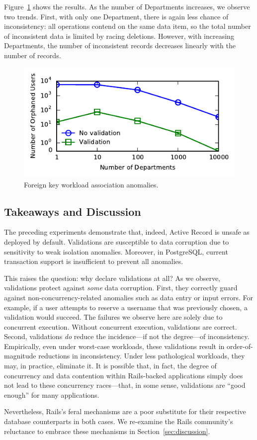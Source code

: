 Figure~\ref{fig:fk-workload} shows the results. As the number of
Departments increases, we observe two trends. First, with only one
Department, there is again less chance of inconsistency: all
operations contend on the same data item, so the total number of
inconsistent data is limited by racing deletions. However, with
increasing Departments, the number of inconsistent records decreases
linearly with the number of records.

\begin{figure}
\includegraphics[width=\columnwidth]{figs/fk-workload-violations.pdf}\vspace{-1em}
\caption{Foreign key workload association anomalies.}
\label{fig:fk-workload}
\end{figure}

\subsection{Takeaways and Discussion}

The preceding experiments demonstrate that, indeed, Active Record is
unsafe as deployed by default. Validations are susceptible to data
corruption due to sensitivity to weak isolation anomalies. Moreover,
in PostgreSQL, current transaction support is insufficient to prevent
all anomalies.

This raises the question: why declare validations at all? As we
observe, validations protect against \textit{some} data
corruption. First, they correctly guard against
non-concurrency-related anomalies such as data entry or input
errors. For example, if a user attempts to reserve a username that was
previously chosen, a validation would succeed. The failures we observe
here are solely due to concurrent execution. Without concurrent
execution, validations are correct. Second, validations
\textit{do} reduce the incidence---if not the degree---of
inconsistency. Empirically, even under worst-case workloads, these
validations result in order-of-magnitude reductions in
inconsistency. Under less pathological workloads, they may, in
practice, eliminate it. It is possible that, in fact, the degree of
concurrency and data contention within Rails-backed applications
simply does not lead to these concurrency races---that, in some sense,
validations are ``good enough'' for many applications.

Nevertheless, Rails's feral mechanisms are a poor substitute for their
respective database counterparts in both cases. We re-examine the Rails community's
reluctance to embrace these mechanisms in Section~\ref{sec:discussion}.

